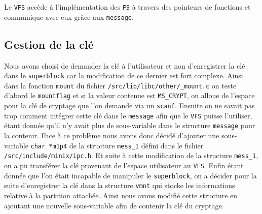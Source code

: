 \documentclass[10pt, onecolumn] {IEEEtran}
\begin{document}
Le \texttt{VFS} accède à l'implémentation des \texttt{FS} à travers des pointeurs de fonctions et communique avec eux grâce aux \texttt{message}. \\

\subsection{Gestion de la clé}

Nous avons choisi de demander la clé à l'utilisateur et non d'enregistrer la clé dans le \texttt{superblock} car la modification de ce dernier est fort complexe. Ainsi dans la fonction \texttt{mount} du fichier \texttt{/src/lib/libc/other/\_mount.c} on teste d'abord le \texttt{mountflag} et si la valeur contenue est \texttt{MS\_CRYPT}, on alloue de l'espace pour la clé de cryptage que l'on demande via un \texttt{scanf}. Ensuite on ne savait pas trop comment intégrer cette clé dans le \texttt{message} afin que le \texttt{VFS} puisse l'utiliser, étant donnée qu'il n'y avait plus de sous-variable dans le structure \texttt{message} pour la contenir. Face à ce problème nous avons donc décidé d'ajouter une sous-variable \texttt{char *m1p4} de la structure \texttt{mess\_1} défini dans le fichier \texttt{/src/include/minix/ipc.h}. Et suite à cette modification de la structure \texttt{mess\_1}, on a pu transférer la clé provenant de l'espace utilisateur au \texttt{VFS}. Enfin étant donnée que l'on était incapable de manipuler le \texttt{superblock}, on a décider pour la suite d'enregistrer la clé dans la structure \texttt{vmnt} qui stocke les informations relative à la partition attachée. Ainsi nous avons modifié cette structure en ajoutant une nouvelle sous-variable afin de contenir la clé du cryptage.     
\end{document}
